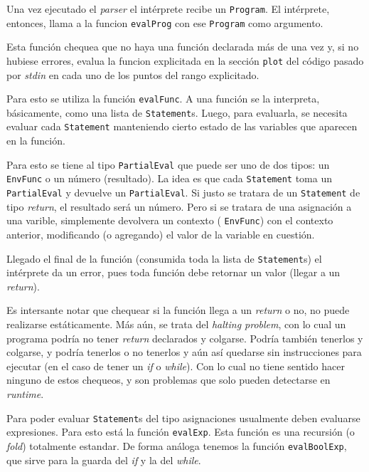Una vez ejecutado el \textit{parser} el int\'erprete recibe un \texttt{Program}.
El int\'erprete, entonces, llama a la funcion \texttt{evalProg} con ese 
\texttt{Program} como argumento.

Esta funci\'on chequea que no haya una funci\'on declarada m\'as de una vez
y, si no hubiese errores, evalua la funcion explicitada en la secci\'on
\texttt{plot} del c\'odigo pasado por \textit{stdin} en cada uno de los puntos
del rango explicitado.

Para esto se utiliza la funci\'on \texttt{evalFunc}. A una funci\'on se la
interpreta, b\'asicamente, como una lista de \texttt{Statement}s.
Luego, para evaluarla, se necesita evaluar cada \texttt{Statement}
manteniendo cierto estado de las variables que aparecen en la funci\'on.

Para esto se tiene al tipo \texttt{PartialEval} que puede ser uno de dos
tipos: un \texttt{EnvFunc} o un n\'umero (resultado).
La idea es que cada \texttt{Statement} toma un \texttt{PartialEval} y
devuelve un \texttt{PartialEval}. Si justo se tratara de un \texttt{Statement}
de tipo \textit{return}, el resultado ser\'a un n\'umero. Pero si se tratara
de una asignaci\'on a una varible, simplemente devolvera un contexto (
\texttt{EnvFunc}) con el contexto anterior, modificando (o agregando) el valor
de la variable en cuesti\'on.

Llegado el final de la funci\'on (consumida toda la lista de \texttt{Statement}s)
el int\'erprete da un error, pues toda funci\'on debe retornar un valor
(llegar a un \textit{return}).

Es intersante notar que chequear si la funci\'on llega a un \textit{return} o
no, no puede realizarse est\'aticamente. M\'as a\'un, se trata del
\textit{halting problem}, con lo cual un programa podr\'ia no tener \textit{return}
declarados y colgarse. Podr\'ia tambi\'en tenerlos y colgarse, y podr\'ia
tenerlos o no tenerlos y a\'un as\'i quedarse sin instrucciones para ejecutar
(en el caso de tener un \textit{if} o \textit{while}). Con lo cual no tiene
sentido hacer ninguno de estos chequeos, y son problemas que solo pueden
detectarse en \textit{runtime}.

Para poder evaluar \texttt{Statement}s del tipo asignaciones usualmente deben
evaluarse expresiones. Para esto est\'a la funci\'on \texttt{evalExp}.
Esta funci\'on es una recursi\'on (o \textit{fold}) totalmente estandar.
De forma an\'aloga tenemos la funci\'on \texttt{evalBoolExp}, que sirve
para la guarda del \textit{if} y la del \textit{while}.

